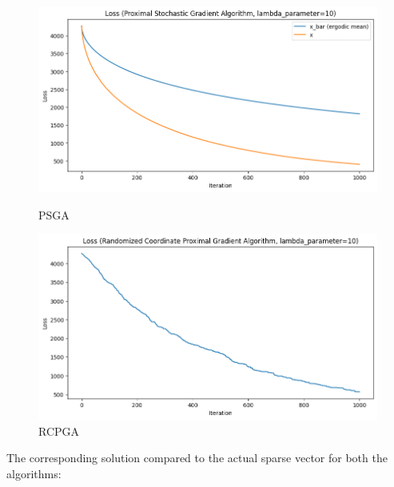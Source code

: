 \documentclass[12pt]{article}
\begin{document}
\begin{figure}[h]
\centering
\begin{minipage}{.5\textwidth}
  \centering
\includegraphics[scale=0.4]{outputs/part_3/psga-loss}
\caption{PSGA}
\label{fig:}
\end{minipage}%
\begin{minipage}{.5\textwidth}
  \centering
\includegraphics[scale=0.4]{outputs/part_3/rcpga-loss}
\caption{RCPGA}
\label{fig:}
\end{minipage}
\end{figure}

The corresponding solution compared to the actual sparse vector for both the algorithms:
\end{document}

